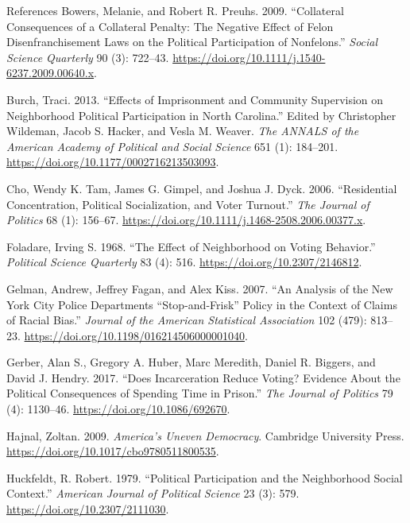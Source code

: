 \documentclass[
  ignorenonframetext,
]{beamer}
\newlength{\cslhangindent}
\newenvironment{cslreferences}%
  {\setlength{\parindent}{0pt}%
  \everypar{\setlength{\hangindent}{\cslhangindent}}\ignorespaces}%
  {\par}
\begin{document}
\begin{frame}{References}
\protect\hypertarget{references}{}
\hypertarget{refs}{}
\begin{cslreferences}
\leavevmode\hypertarget{ref-Bowers2009}{}%
Bowers, Melanie, and Robert R. Preuhs. 2009. ``Collateral Consequences
of a Collateral Penalty: The Negative Effect of Felon Disenfranchisement
Laws on the Political Participation of Nonfelons.'' \emph{Social Science
Quarterly} 90 (3): 722--43.
\url{https://doi.org/10.1111/j.1540-6237.2009.00640.x}.

\leavevmode\hypertarget{ref-Burch2013}{}%
Burch, Traci. 2013. ``Effects of Imprisonment and Community Supervision
on Neighborhood Political Participation in North Carolina.'' Edited by
Christopher Wildeman, Jacob S. Hacker, and Vesla M. Weaver. \emph{The
ANNALS of the American Academy of Political and Social Science} 651 (1):
184--201. \url{https://doi.org/10.1177/0002716213503093}.

\leavevmode\hypertarget{ref-Cho2006}{}%
Cho, Wendy K. Tam, James G. Gimpel, and Joshua J. Dyck. 2006.
``Residential Concentration, Political Socialization, and Voter
Turnout.'' \emph{The Journal of Politics} 68 (1): 156--67.
\url{https://doi.org/10.1111/j.1468-2508.2006.00377.x}.

\leavevmode\hypertarget{ref-Foladare1968}{}%
Foladare, Irving S. 1968. ``The Effect of Neighborhood on Voting
Behavior.'' \emph{Political Science Quarterly} 83 (4): 516.
\url{https://doi.org/10.2307/2146812}.

\leavevmode\hypertarget{ref-Gelman2007}{}%
Gelman, Andrew, Jeffrey Fagan, and Alex Kiss. 2007. ``An Analysis of the
New York City Police Departments ``Stop-and-Frisk'' Policy in the
Context of Claims of Racial Bias.'' \emph{Journal of the American
Statistical Association} 102 (479): 813--23.
\url{https://doi.org/10.1198/016214506000001040}.

\leavevmode\hypertarget{ref-Gerber2017}{}%
Gerber, Alan S., Gregory A. Huber, Marc Meredith, Daniel R. Biggers, and
David J. Hendry. 2017. ``Does Incarceration Reduce Voting? Evidence
About the Political Consequences of Spending Time in Prison.'' \emph{The
Journal of Politics} 79 (4): 1130--46.
\url{https://doi.org/10.1086/692670}.

\leavevmode\hypertarget{ref-Hajnal2009}{}%
Hajnal, Zoltan. 2009. \emph{America's Uneven Democracy}. Cambridge
University Press. \url{https://doi.org/10.1017/cbo9780511800535}.

\leavevmode\hypertarget{ref-Huckfeldt1979}{}%
Huckfeldt, R. Robert. 1979. ``Political Participation and the
Neighborhood Social Context.'' \emph{American Journal of Political
Science} 23 (3): 579. \url{https://doi.org/10.2307/2111030}.


\end{cslreferences}
\end{frame}
\end{document}
